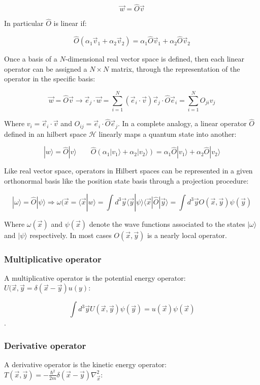 	$$\vec{w} = \hat{O}\vec{v}$$

	In particular $\hat{O}$ is linear if:

	$$\hat{O}(\alpha_1\vec{v}_1 + \alpha_2\vec{v}_2) = \alpha_1\hat{O}\vec{v}_1 + \alpha_2\hat{O}\vec{v}_2$$

	Once a basis of a $N$-dimensional real vector space is defined, then each linear operator can be assigned a $N\times N$ matrix, through the representation of the operator in the specific basis:

	$$\vec{w} = \hat{O}\vec{v}\rightarrow \vec{e}_j\cdot\vec{w} = \sum\limits_{i=1}^N(\vec{e}_i\cdot\vec{v})\vec{e}_j\cdot\hat{O}\vec{e}_i = \sum\limits_{i=1}^NO_{ji}v_j$$

	Where $v_i = \vec{e}_i\cdot \vec{v}$ and $O_{ij} = \vec{e}_i\cdot\hat{O}\vec{e}_j$.
	In a complete analogy, a linear operator $\hat{O}$ defined in an hilbert space $\mathcal{H}$ linearly maps a quantum state into another:

	$$|w\rangle = \hat{O}|v\rangle\qquad \hat{O}(\alpha_1|v_1\rangle + \alpha_2|v_2\rangle) = \alpha_1\hat{O}|v_1\rangle +  \alpha_2\hat{O}|v_2\rangle$$

	Like real vector space, operators in Hilbert spaces can be represented in a given orthonormal basis like the position state basis through a projection procedure:

	$$|\omega\rangle = \hat{O}|\psi\rangle\Rightarrow \omega(\vec{x} = \langle\vec{x}|w\rangle = \int d^3\vec{y}\langle\vec{y}|\psi\rangle\langle\vec{x}|\hat{O}|\vec{y}\rangle = \int d^3\vec{y} O(\vec{x}, \vec{y})\psi(\vec{y})$$

	Where $\omega(\vec{x})$ and $\psi(\vec{x})$ denote the wave functions associated to the states $|\omega\rangle$ and $|\psi\rangle$ respectively.
	In most cases $O(\vec{x}, \vec{y})$ is a nearly local operator.

		\subsubsection{Multiplicative operator}
		A multiplicative operator is the potential energy operator: $U(\vec{x}, \vec{y} = \delta(\vec{x}-\vec{y})u(y)$:

		$$\int d^3\vec{y}U(\vec{x}, \vec{y})\psi(\vec{y}) = u(\vec{x})\psi(\vec{x})$$.

		\subsubsection{Derivative operator}
		A derivative operator is the kinetic energy operator: $T(\vec{x}, \vec{y}) = -\frac{\hbar^2}{2m}\delta(\vec{x}-\vec{y})\nabla^2_{\vec{x}}$:

